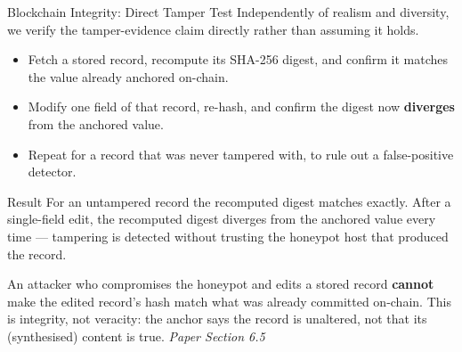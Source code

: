 \documentclass[aspectratio=169, 11pt]{beamer}
\newcommand{\srcnote}[1]{{\footnotesize\color{gray}\textit{#1}}}
\begin{document}
\begin{frame}{Blockchain Integrity: Direct Tamper Test}
    Independently of realism and diversity, we verify the tamper-evidence claim directly rather than assuming it holds.
    \begin{itemize}
        \item Fetch a stored record, recompute its SHA-256 digest, and confirm it matches the value already anchored on-chain.
        \item Modify one field of that record, re-hash, and confirm the digest now \textbf{diverges} from the anchored value.
        \item Repeat for a record that was never tampered with, to rule out a false-positive detector.
    \end{itemize}
    \vspace{2mm}
    \begin{block}{\small Result}
        \small For an untampered record the recomputed digest matches exactly. After a single-field edit, the recomputed digest diverges from the anchored value every time --- tampering is detected without trusting the honeypot host that produced the record.
    \end{block}
    \vspace{2mm}
    \small An attacker who compromises the honeypot and edits a stored record \textbf{cannot} make the edited record's hash match what was already committed on-chain. This is integrity, not veracity: the anchor says the record is unaltered, not that its (synthesised) content is true.
    \srcnote{Paper Section 6.5}
\end{frame}

\end{document}
